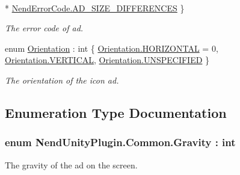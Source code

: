 \begin{DoxyCompactItemize}
\\*
\hyperlink{namespace_nend_unity_plugin_1_1_common_a9bcb251827acb8ae5f3a35fc9de7195ea81bf3272bed20a4312fab10df5cea0e8}{Nend\+Error\+Code.\+A\+D\+\_\+\+S\+I\+Z\+E\+\_\+\+D\+I\+F\+F\+E\+R\+E\+N\+C\+E\+S}
 \}
\begin{DoxyCompactList}\small\item\em The error code of ad. \end{DoxyCompactList}\item 
enum \hyperlink{namespace_nend_unity_plugin_1_1_common_af66c0e2b8ebbf19f10df658ba51d5962}{Orientation} \+: int \{ \hyperlink{namespace_nend_unity_plugin_1_1_common_af66c0e2b8ebbf19f10df658ba51d5962a86e5d0d8407ce71f7e2004ef3949894e}{Orientation.\+H\+O\+R\+I\+Z\+O\+N\+T\+A\+L} = 0, 
\hyperlink{namespace_nend_unity_plugin_1_1_common_af66c0e2b8ebbf19f10df658ba51d5962a3e1b74251c07310c5f1b968145bf00dc}{Orientation.\+V\+E\+R\+T\+I\+C\+A\+L}, 
\hyperlink{namespace_nend_unity_plugin_1_1_common_af66c0e2b8ebbf19f10df658ba51d5962a1c04cc3823d476c3017238679a0fdf52}{Orientation.\+U\+N\+S\+P\+E\+C\+I\+F\+I\+E\+D}
 \}
\begin{DoxyCompactList}\small\item\em The orientation of the icon ad. \end{DoxyCompactList}\end{DoxyCompactItemize}


\subsection{Enumeration Type Documentation}
\hypertarget{namespace_nend_unity_plugin_1_1_common_a8aa5efc54dabd2a35e51892bec9e28d6}{}
\subsubsection[{Gravity}]{\setlength{\rightskip}{0pt plus 5cm}enum {\bf Nend\+Unity\+Plugin.\+Common.\+Gravity} \+: int}\label{namespace_nend_unity_plugin_1_1_common_a8aa5efc54dabd2a35e51892bec9e28d6}


The gravity of the ad on the screen. 

